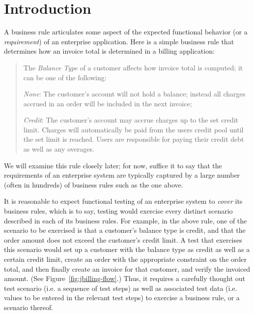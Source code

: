 \section{Introduction}

A business rule articulates some aspect of the expected functional behavior (or a \textit{requirement})
of an enterprise application. Here is a simple business rule that determines how an invoice total is 
determined in a billing application:

\begin{quote}
	The \textit{Balance Type} of a customer affects how invoice total is computed; it can be 
	one of the following:

	\textit{None}: The customer's account will not hold a balance; instead all charges accrued 
	in an order will be included in the next invoice;
	
	\textit{Credit}: The customer's account may accrue charges up to the set credit limit. 
	Charges will automatically be paid from the users credit pool until the set limit is reached. 
	Users are responsible for paying their credit debt as well as any overages.
\end{quote}	

We will examine this rule closely later; for now, suffice it to say that the requirements 
of an enterprise system are typically captured by a large number (often in hundreds) of business rules
such as the one above.

It is reasonable to expect functional testing of an enterprise system to \textit{cover} its 
business rules, which is to say, testing would exercise every distinct scenario described in each of
its business rules.  For example, in the above rule, one of the scenario to be exercised is
that a customer's balance type is credit, and that the order amount does not exceed the customer's credit limit.
A test that exercises this scenario would set up a customer with the balance type as credit as well as a certain
credit limit, create an order with the appropriate constraint on the order total, and then finally
create an invoice for that customer, and verify the invoiced amount.  (See Figure~\ref{fig:jbilling-flow}.) 
Thus, it requires a carefully thought out test scenario (i.e. a sequence of test steps) as well as associated 
test data (i.e. values to be entered in the relevant test steps) to exercise a business rule, or a scenario 
thereof.

